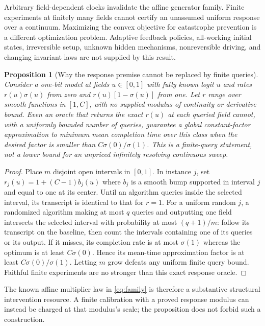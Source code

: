 \documentclass[11pt]{article}
\newtheorem{proposition}[theorem]{Proposition}
\begin{document}
Arbitrary field-dependent clocks invalidate the affine generator family.
Finite experiments at finitely many fields cannot certify an unassumed
uniform response over a continuum. Maximizing the convex objective for
catastrophe prevention is a different optimization problem. Adaptive
feedback policies, all-working initial states, irreversible setup,
unknown hidden mechanisms, nonreversible driving, and changing invariant
laws are not supplied by this result.

\begin{proposition}[Why the response premise cannot be replaced by finite queries]
Consider a one-bit model at fields $u\in[0,1]$ with fully known logit $u$
and rates $r(u)\sigma(u)$ from zero and $r(u)[1-\sigma(u)]$ from one.
Let $r$ range over smooth functions in $[1,C]$, with no supplied modulus
of continuity or derivative bound. Even an oracle that returns the exact
$r(u)$ at each queried field cannot, with a uniformly bounded number of
queries, guarantee a global constant-factor approximation to minimum
mean completion time over this class when the desired factor is smaller
than $C\sigma(0)/\sigma(1)$. This is a finite-query statement, not a
lower bound for an unpriced infinitely resolving continuous sweep.
\end{proposition}
\begin{proof}
Place $m$ disjoint open intervals in $[0,1]$. In instance $j$, set
$r_j(u)=1+(C-1)b_j(u)$ where $b_j$ is a smooth bump supported in interval
$j$ and equal to one at its center. Until an algorithm queries inside
the selected interval, its transcript is identical to that for $r=1$.
For a uniform random $j$, a randomized algorithm making at most $q$
queries and outputting one field intersects the selected interval with
probability at most $(q+1)/m$: follow its transcript on the baseline,
then count the intervals containing one of its queries or its output.
If it misses, its completion rate is at most $\sigma(1)$ whereas the
optimum is at least $C\sigma(0)$. Hence its mean-time approximation
factor is at least $C\sigma(0)/\sigma(1)$. Letting $m$ grow defeats any
uniform finite query bound. Faithful finite experiments are no stronger
than this exact response oracle.
\end{proof}

The known affine multiplier law in \eqref{eq:family} is therefore a
substantive structural intervention resource. A finite calibration with
a proved response modulus can instead be charged at that modulus's
scale; the proposition does not forbid such a construction.
\end{document}
